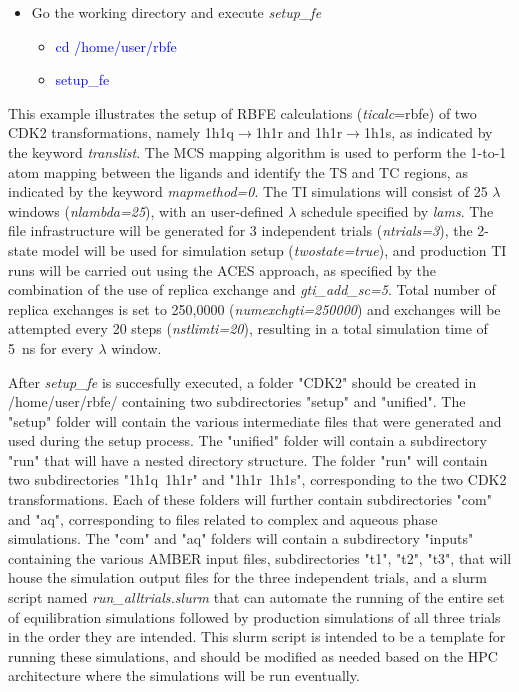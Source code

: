 \documentclass[11pt,letterpaper,titlepage]{article}
\begin{document}
\begin{itemize}
	\item Go the working directory and execute \textit{setup\_fe}
                \begin{itemize}
                        \setlength{\itemindent}{3em}

                        \item[] \textcolor{blue}{cd  /home/user/rbfe} \\
                        \item[] \textcolor{blue}{setup\_fe} \\
                \end{itemize}
	
\end{itemize}

This example illustrates the setup of RBFE calculations (\textit{ticalc}=rbfe) 
of two CDK2 transformations, namely 1h1q$\rightarrow$1h1r and 1h1r$\rightarrow$1h1s, 
as indicated by the keyword \textit{translist}. The MCS mapping algorithm is used to perform the
1-to-1 atom mapping between the ligands and identify the TS and TC regions, as indicated by the
keyword \textit{mapmethod=0}. The TI simulations will consist of 25 $\lambda$ windows (\textit{nlambda=25}), with an 
user-defined $\lambda$ schedule specified by \textit{lams}. 
The file infrastructure will be generated for 3 independent trials (\textit{ntrials=3}), 
the 2-state model will be used for simulation setup (\textit{twostate=true}), and 
production TI runs will be carried out using the ACES approach, as specified by the combination of 
the use of replica exchange and \textit{gti\_add\_sc=5}. Total number of replica exchanges is set to 250,0000 
(\textit{numexchgti=250000}) and exchanges will be attempted every 20 steps (\textit{nstlimti=20}), resulting in 
a total simulation time of 5~ns for every $\lambda$ window.

After \textit{setup\_fe} is succesfully executed, a folder "CDK2" should be created in /home/user/rbfe/ 
containing two subdirectories "setup" and "unified". The "setup" folder will contain the various intermediate
files that were generated and used during the setup process. The "unified" folder will contain a subdirectory
"run" that will have a nested directory structure. The folder "run" will contain 
two subdirectories "1h1q~1h1r" and "1h1r~1h1s", corresponding to the two CDK2 transformations.
Each of these folders will further contain subdirectories "com" and "aq", 
corresponding to files related to complex and aqueous phase simulations. The "com" and "aq" folders
will contain a subdirectory "inputs" containing the various AMBER input files, subdirectories "t1", "t2", "t3", 
that will house the simulation output files for the three independent trials, and a slurm script 
named \textit{run\_alltrials.slurm} that can automate the running of the entire set of equilibration 
simulations followed by production simulations of all three trials in the order they are intended. This 
slurm script is intended to be a template for running these simulations, and should be modified 
as needed based on the HPC architecture where the simulations will be run eventually. 
\end{document}
